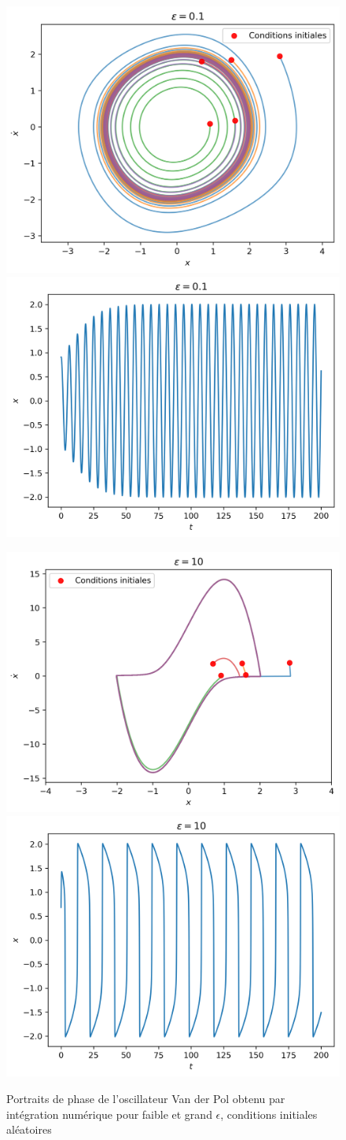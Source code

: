 \begin{figure}[t]
    \centering
    \begin{subcaptionblock}{0.9\linewidth}
        \includegraphics[width=.45\linewidth]{images/vdp/vanderpol_small.png}%
        \hfill
        \includegraphics[width=.45\linewidth]{images/vdp/vanderpol_small_x.png}%
    \end{subcaptionblock}
    \centering
    \begin{subcaptionblock}{0.9\linewidth}
        \includegraphics[width=.45\linewidth]{images/vdp/vanderpol_large.png}%
        \hfill
        \includegraphics[width=.45\linewidth]{images/vdp/vanderpol_large_x.png}%
    \end{subcaptionblock}
    \label{fig:portrait_vdp}
    \caption{Portraits de phase de l'oscillateur Van der Pol obtenu par intégration numérique pour faible et grand $\epsilon$, conditions initiales aléatoires}
\end{figure}
